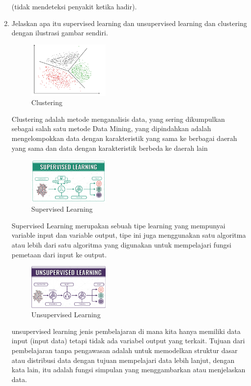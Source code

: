 \begin{enumerate}
	(tidak mendeteksi penyakit ketika hadir).
	\item Jelaskan apa itu supervised learning dan unsupervised learning dan clustering dengan ilustrasi gambar sendiri.
	\hfill\break
	\begin{figure}[H]
		\includegraphics[width=4cm]{figures/1174031/2/clustering.jpg}
		\centering
		\caption{Clustering}
	\end{figure}
	\hfill\break
	Clustering adalah metode menganalisis data, yang sering dikumpulkan sebagai salah satu metode Data Mining, 
	yang dipindahkan adalah mengelompokkan data dengan karakteristik yang sama ke berbagai daerah yang sama dan data dengan karakteristik berbeda ke daerah lain
	\begin{figure}[H]
		\includegraphics[width=4cm]{figures/1174031/2/supervised.png}
		\centering
		\caption{Supervised Learning}
	\end{figure}
	\hfill\break
	Supervised Learning merupakan sebuah tipe learning yang mempunyai variable input dan variable output, 
	tipe ini juga menggunakan satu algoritma atau lebih dari satu algoritma yang digunakan untuk mempelajari fungsi pemetaan dari input ke output.
	\begin{figure}[H]
		\includegraphics[width=4cm]{figures/1174031/2/unsupervised.png}
		\centering
		\caption{Unsupervised Learning}
	\end{figure}
	\hfill\break
	unsupervised learning jenis pembelajaran di mana kita hanya memiliki data input (input data) tetapi tidak ada variabel output yang terkait. 
	Tujuan dari pembelajaran tanpa pengawasan adalah untuk memodelkan struktur dasar atau distribusi data dengan tujuan mempelajari data lebih lanjut, 
	dengan kata lain, itu adalah fungsi simpulan yang menggambarkan atau menjelaskan data.

\end{enumerate}
